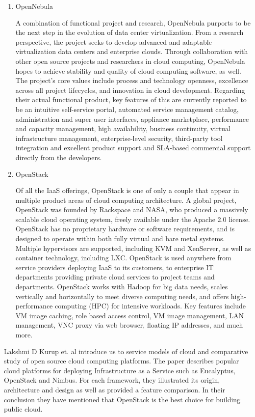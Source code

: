 \begin{enumerate}
    \item OpenNebula
    
    \par A combination of functional project and research, OpenNebula purports to be the next step in the evolution of data center virtualization. From a research perspective, the project seeks to develop advanced and adaptable virtualization data centers and enterprise clouds. Through collaboration with other open source projects and researchers in cloud computing, OpenNebula hopes to achieve stability and quality of cloud computing software, as well. The project's core values include process and technology openness, excellence across all project lifecycles, and innovation in cloud development. Regarding their actual functional product, key features of this are currently reported to be an intuitive self-service portal, automated service management catalog, administration and super user interfaces, appliance marketplace, performance and capacity management, high availability, business continuity, virtual infrastructure management, enterprise-level security, third-party tool integration and excellent product support and SLA-based commercial support directly from the developers.

    \item OpenStack
    
    \par Of all the IaaS offerings, OpenStack is one of only a couple that appear in multiple product areas of cloud computing architecture. A global project, OpenStack was founded by Rackspace and NASA, who produced a massively scalable cloud operating system, freely available under the Apache 2.0 license. OpenStack has no proprietary hardware or software requirements, and is designed to operate within both fully virtual and bare metal systems. Multiple hypervisors are supported, including KVM and XenServer, as well as container technology, including LXC. OpenStack is used anywhere from service providers deploying IaaS to its customers, to enterprise IT departments providing private cloud services to project teams and departments. OpenStack works with Hadoop for big data needs, scales vertically and horizontally to meet diverse computing needs, and offers high-performance computing (HPC) for intensive workloads. Key features include VM image caching, role based access control, VM image management, LAN management, VNC proxy via web browser, floating IP addresses, and much more.
\end{enumerate}

\par Lakshmi D Kurup et. al \cite{lakshmi} introduce us to service models of cloud and comparative study of open source cloud computing platforms. The paper describes popular cloud platforms for deploying Infrastructure as a Service such as Eucalyptus, OpenStack and Nimbus. For each framework, they illustrated its origin, architecture and design as well as provided a feature comparison. In their conclusion they have mentioned that OpenStack is the best choice for building public cloud. 